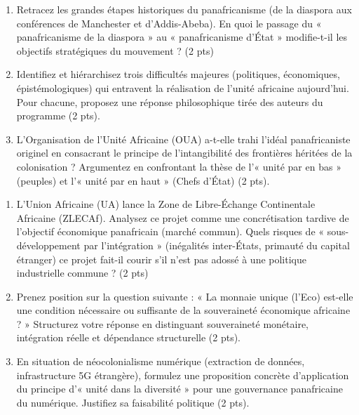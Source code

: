 \documentclass[11pt]{article}
\begin{document}
\begin{exercice}
\begin{enumerate}
    \item Retracez les grandes étapes historiques du panafricanisme (de la diaspora aux conférences de Manchester et d'Addis-Abeba). En quoi le passage du « panafricanisme de la diaspora » au « panafricanisme d'État » modifie-t-il les objectifs stratégiques du mouvement ? (2 pts)
    \item Identifiez et hiérarchisez trois difficultés majeures (politiques, économiques, épistémologiques) qui entravent la réalisation de l'unité africaine aujourd'hui. Pour chacune, proposez une réponse philosophique tirée des auteurs du programme (2 pts).
    \item L'Organisation de l'Unité Africaine (OUA) a-t-elle trahi l'idéal panafricaniste originel en consacrant le principe de l'intangibilité des frontières héritées de la colonisation ? Argumentez en confrontant la thèse de l'« unité par en bas » (peuples) et l'« unité par en haut » (Chefs d'État) (2 pts).
\end{enumerate}
\end{exercice}

\begin{exercice}
\begin{enumerate}
    \item L'Union Africaine (UA) lance la Zone de Libre-Échange Continentale Africaine (ZLECAf). Analysez ce projet comme une concrétisation tardive de l'objectif économique panafricain (marché commun). Quels risques de « sous-développement par l'intégration » (inégalités inter-États, primauté du capital étranger) ce projet fait-il courir s'il n'est pas adossé à une politique industrielle commune ? (2 pts)
    \item Prenez position sur la question suivante : « La monnaie unique (l'Eco) est-elle une condition nécessaire ou suffisante de la souveraineté économique africaine ? » Structurez votre réponse en distinguant souveraineté monétaire, intégration réelle et dépendance structurelle (2 pts).
    \item En situation de néocolonialisme numérique (extraction de données, infrastructure 5G étrangère), formulez une proposition concrète d'application du principe d'« unité dans la diversité » pour une gouvernance panafricaine du numérique. Justifiez sa faisabilité politique (2 pts).
\end{enumerate}
\end{exercice}
\end{document}
